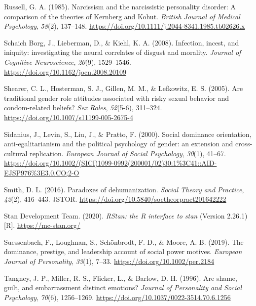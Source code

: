 \documentclass[
  donotrepeattitle,doc, 12pt, a4paper,floatsintext]{apa7}
\newlength{\cslhangindent}
\newlength{\cslentryspacingunit} %
\newenvironment{CSLReferences}[2] %
 {%
  \setlength{\parindent}{0pt}
  \ifodd #1
  \let\oldpar\par
  \def\par{\hangindent=\cslhangindent\oldpar}
  \fi
  \setlength{\parskip}{#2\cslentryspacingunit}
 }%
 {}
\begin{document}
\begin{CSLReferences}{1}{0}
\leavevmode{}%
Russell, G. A. (1985). Narcissism and the narcissistic personality disorder: A comparison of the theories of Kernberg and Kohut. \emph{British Journal of Medical Psychology}, \emph{58}(2), 137--148. \url{https://doi.org/10.1111/j.2044-8341.1985.tb02626.x}

\leavevmode{}%
Schaich Borg, J., Lieberman, D., \& Kiehl, K. A. (2008). Infection, incest, and iniquity: investigating the neural correlates of disgust and morality. \emph{Journal of Cognitive Neuroscience}, \emph{20}(9), 1529--1546. \url{https://doi.org/10.1162/jocn.2008.20109}

\leavevmode{}%
Shearer, C. L., Hosterman, S. J., Gillen, M. M., \& Lefkowitz, E. S. (2005). Are traditional gender role attitudes associated with risky sexual behavior and condom-related beliefs? \emph{Sex Roles}, \emph{52}(5-6), 311--324. \url{https://doi.org/10.1007/s11199-005-2675-4}

\leavevmode{}%
Sidanius, J., Levin, S., Liu, J., \& Pratto, F. (2000). Social dominance orientation, anti-egalitarianism and the political psychology of gender: an extension and cross-cultural replication. \emph{European Journal of Social Psychology}, \emph{30}(1), 41--67. \url{https://doi.org/10.1002/(SICI)1099-0992(200001/02)30:1\%3C41::AID-EJSP976\%3E3.0.CO;2-O}

\leavevmode{}%
Smith, D. L. (2016). Paradoxes of dehumanization. \emph{Social Theory and Practice}, \emph{42}(2), 416--443. JSTOR. \url{https://doi.org/10.5840/soctheorpract201642222}

\leavevmode{}%
Stan Development Team. (2020). \emph{RStan: the R interface to stan} (Version 2.26.1) {[}R{]}. \url{https://mc-stan.org/}

\leavevmode{}%
Suessenbach, F., Loughnan, S., Schönbrodt, F. D., \& Moore, A. B. (2019). The dominance, prestige, and leadership account of social power motives. \emph{European Journal of Personality}, \emph{33}(1), 7--33. \url{https://doi.org/10.1002/per.2184}

\leavevmode{}%
Tangney, J. P., Miller, R. S., Flicker, L., \& Barlow, D. H. (1996). Are shame, guilt, and embarrassment distinct emotions? \emph{Journal of Personality and Social Psychology}, \emph{70}(6), 1256--1269. \url{https://doi.org/10.1037/0022-3514.70.6.1256}


\end{CSLReferences}
\end{document}
